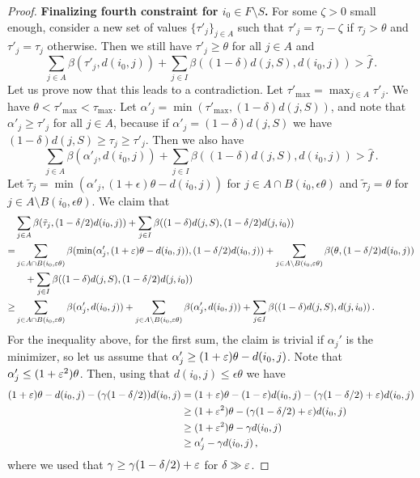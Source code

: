 \begin{proof}
\textbf{Finalizing fourth constraint for $i_0 \in F \setminus S$.}
For some $\zeta > 0$ small enough, consider a new set of values $\{\tau'_j\}_{j \in A}$ such that $\tau'_j = \tau_j - \zeta$ if $\tau_j > \theta$ and $\tau'_j = \tau_j$ otherwise.
Then we still have $\tau'_j \geq \theta$ for all $j \in A$ and 
\[\sum_{j \in A} \beta(\tau'_j, d(i_0, j)) + \sum_{j \in I}\beta((1-\delta)d(j,S), d(i_0, j)) > \hat{f}\,.\]
Let us prove now that this leads to a contradiction.
Let $\tau'_{\max} = \max_{j \in A} \tau'_j$. We have $\theta < \tau'_{\max} < \tau_{\max}$.
Let $\alpha'_j = \min(\tau'_{\max}, (1-\delta)d(j,S))$, and note that $\alpha'_j \geq \tau'_{j}$ for all $j \in A$, because if $\alpha'_j = (1-\delta) d(j,S)$ we have $(1-\delta) d(j,S) \geq \tau_j \geq \tau'_j$.
Then we also have
\[\sum_{j \in A} \beta(\alpha'_j, d(i_0, j)) + \sum_{j \in I}\beta((1-\delta)d(j,S), d(i_0, j)) > \hat{f}\,.\]
Let $\tilde{\tau}_j = \min(\alpha'_j, (1+\epsilon) \theta - d(i_0, j))$ for $j \in A \cap B(i_0, \epsilon \theta)$ and $\tilde{\tau}_j = \theta$ for $j \in A \setminus B(i_0, \epsilon \theta)$.
We claim that 
\begin{align*}
&\sum_{j \in A} \beta(\tilde\tau_j, (1-\delta/2) d(i_0, j)) + \sum_{j \in I}\beta((1-\delta)d(j,S), (1-\delta/2)d(j, i_0))\\
=& \sum_{j \in A \cap B(i_0, \varepsilon\theta)}  \beta(\min(\alpha'_j, (1+\varepsilon) \theta - d(i_0, j)), (1-\delta/2) d(i_0, j)) + \sum_{j \in A \setminus B(i_0, \varepsilon\theta)}  \beta(\theta, (1-\delta/2) d(i_0, j))\\
&\quad + \sum_{j \in I}\beta((1-\delta)d(j,S), (1-\delta/2)d(j, i_0))\\
\geq& \sum_{j \in A \cap B(i_0, \varepsilon\theta)}  \beta(\alpha'_j, d(i_0, j)) + \sum_{j \in A \setminus B(i_0, \varepsilon\theta)}  \beta(\alpha'_j, d(i_0, j)) + \sum_{j \in I}\beta((1-\delta)d(j,S), d(j, i_0))\,. 
\end{align*}
For the inequality above, for the first sum, the claim is trivial if $\alpha_j'$ is the minimizer, so let us assume that $\alpha_j' \geq (1+\varepsilon)\theta - d(i_0, j)$. Note that $\alpha_j' \leq (1+\varepsilon^2)\theta$.
Then, using that $d(i_0, j) \leq \epsilon \theta$ we have 
\begin{align*}
(1+\varepsilon) \theta - d(i_0, j)-(\gamma (1-\delta/2)) d(i_0, j)
&= (1+\varepsilon) \theta - (1-\varepsilon)d(i_0, j)-(\gamma (1-\delta/2) + \varepsilon) d(i_0, j)\\
&\geq (1+\varepsilon^2) \theta - (\gamma (1-\delta/2) + \varepsilon)d(i_0,j)\\
&\geq (1+\varepsilon^2)\theta - \gamma d(i_0, j)\\
&\geq \alpha_j' - \gamma d(i_0, j)\,,
\end{align*}
where we used that $\gamma \geq \gamma (1-\delta/2) + \varepsilon$ for $\delta \gg \varepsilon$.


\end{proof}
